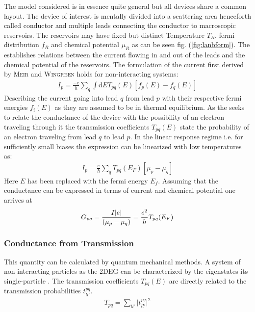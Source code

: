 The model considered is in essence quite general but all devices share a common layout. The device of interest is mentally divided into a scattering area henceforth called conductor and multiple leads connecting the conductor to macroscopic reservoirs. The reservoirs may have fixed but distinct Temperature $T_R$, fermi distribution $f_R$ and chemical potential $\mu_R$ as can be seen fig. (\ref{fig:lanbform}).
The \lanbform{} establishes relations between the current flowing in and out of the leads and the chemical potential of the reservoirs. The formulation of the current first derived by \textsc{Meir} and \textsc{Wingreen}\cite{} holds for non-interacting systems:
\begin{align}
I_p=\frac{-e}{h} \sum_q \int \text{d}E T_{pq}(E) [f_p(E) - f_q(E)]
\label{eqn:current}
\end{align}
Describing the current going into lead $q$ from lead $p$ with their respective fermi energies $f_i(E)$ as they are assumed to be in thermal equilibrium. 
As the \lanbform{} seeks to relate the conductance of the device with the possibility of an electron traveling through it the transmission coefficients $T_{pq}(E)$ state the probability of an electron traveling from lead $q$ to lead $p$. 
In the linear response regime i.e. for sufficiently small biases the expression can be linearized with low temperatures as:
\begin{align}
I_p=\frac{e}{h} \sum_q T_{pq}(E_F) [\mu_p - \mu_q]
\label{eqn:currentlin}
\end{align}
Here $E$ has been replaced with the fermi energy $E_f$.
Assuming that the conductance can be expressed in terms of current and chemical potential one arrives at
\begin{align}
G_{pq}=\frac{I\lvert e\rvert}{(\mu_p - \mu_q)}=\frac{e^2}{h} T_{pq}(E_F)
\label{eqn:conductance}
\end{align}
\subsubsection{Conductance from Transmission}
This quantity can be calculated by quantum mechanical methods. A system of non-interacting particles as the 2DEG can be characterized by the eigenstates its single-particle \hamil{}. The transmission coefficients $T_{pq}(E)$ are directly related to the transmission probabilities $t^{pq}_{ll'}$.
\begin{align}
T_{pq} = \sum_{ll'} \lvert t^{pq}_{ll'} \rvert ^2
\label{eqn:transcoeff}
\end{align}
 


